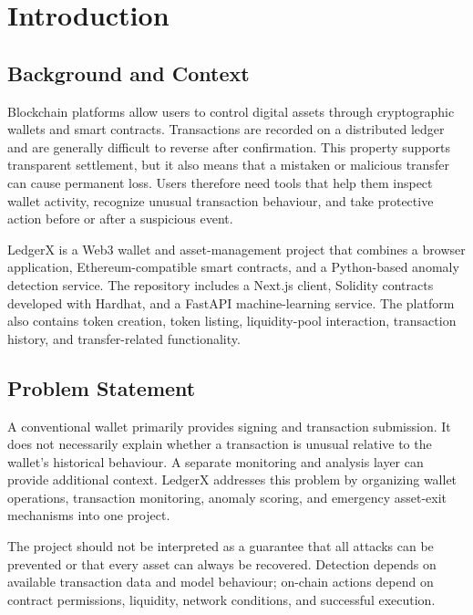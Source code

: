 \documentclass{tietreport}
\author{%
  \texttt{1024030433} Ishan Rehan\\
  \texttt{1024030812} A S Danish\\
  \texttt{1024030813} Shreyansh Dua\\
  \texttt{1024030483} Shaurya Garg%
}
\begin{document}
\maketitle
\tableofcontents
\listoffigures
\listoftables

\chapter{Introduction}

\section{Background and Context}
Blockchain platforms allow users to control digital assets through cryptographic
wallets and smart contracts. Transactions are recorded on a distributed ledger
and are generally difficult to reverse after confirmation. This property supports
transparent settlement, but it also means that a mistaken or malicious transfer
can cause permanent loss. Users therefore need tools that help them inspect
wallet activity, recognize unusual transaction behaviour, and take protective
action before or after a suspicious event.

LedgerX is a Web3 wallet and asset-management project that combines a browser
application, Ethereum-compatible smart contracts, and a Python-based anomaly
detection service. The repository includes a Next.js client, Solidity contracts
developed with Hardhat, and a FastAPI machine-learning service. The platform
also contains token creation, token listing, liquidity-pool interaction,
transaction history, and transfer-related functionality.

\section{Problem Statement}
A conventional wallet primarily provides signing and transaction submission.
It does not necessarily explain whether a transaction is unusual relative to
the wallet's historical behaviour. A separate monitoring and analysis layer
can provide additional context. LedgerX addresses this problem by organizing
wallet operations, transaction monitoring, anomaly scoring, and emergency
asset-exit mechanisms into one project.

The project should not be interpreted as a guarantee that all attacks can be
prevented or that every asset can always be recovered. Detection depends on
available transaction data and model behaviour; on-chain actions depend on
contract permissions, liquidity, network conditions, and successful execution.
\end{document}
